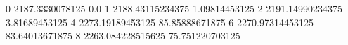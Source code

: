 0 2187.3330078125 0.0
1 2188.43115234375 1.09814453125
2 2191.14990234375 3.81689453125
4 2273.19189453125 85.85888671875
6 2270.97314453125 83.64013671875
8 2263.084228515625 75.751220703125
